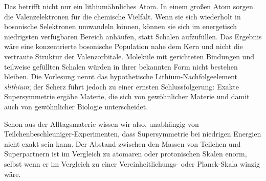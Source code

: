 Das betrifft nicht nur ein lithiumähnliches Atom. In einem großen Atom sorgen die Valenzelektronen für die chemische Vielfalt. Wenn sie sich wiederholt in bosonische Selektronen umwandeln können, können sie sich im energetisch niedrigsten verfügbaren Bereich anhäufen, statt Schalen aufzufüllen. Das Ergebnis wäre eine konzentrierte bosonische Population nahe dem Kern und nicht die vertraute Struktur der Valenzorbitale. Moleküle mit gerichteten Bindungen und teilweise gefüllten Schalen würden in ihrer bekannten Form nicht bestehen bleiben. Die Vorlesung nennt das hypothetische Lithium-Nachfolgeelement \emph{slithium}; der Scherz führt jedoch zu einer ernsten Schlussfolgerung: Exakte Supersymmetrie ergäbe Materie, die sich von gewöhnlicher Materie und damit auch von gewöhnlicher Biologie unterscheidet.

\begin{classroomqa}
\end{classroomqa}

Schon aus der Alltagsmaterie wissen wir also, unabhängig von Teilchenbeschleuniger-Experimenten, dass Supersymmetrie bei niedrigen Energien nicht exakt sein kann. Der Abstand zwischen den Massen von Teilchen und Superpartnern ist im Vergleich zu atomaren oder protonischen Skalen enorm, selbst wenn er im Vergleich zu einer Vereinheitlichungs- oder Planck-Skala winzig wäre.

\begin{classroomqa}
\end{classroomqa}

